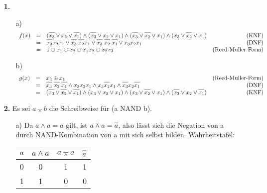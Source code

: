 \documentclass[a4paper,10pt]{scrartcl}
\begin{document}
\begin{enumerate}
    \item[\textbf{1.}]
    \begin{enumerate}
        \item[a)]
            $$\begin{array}{rclr}
                f(x)
                &=& (\oline{x_3} \vee x_2 \vee \oline{x_1}) \wedge (\oline{x_3} \vee x_2 \vee x_1) \wedge
                    (\oline{x_3} \vee \oline{x_2} \vee x_1) \wedge (x_3 \vee  \oline{x_2} \vee x_1) & \text{(KNF)}\\
                &=& \oline{x_3}x_2x_1 \vee \oline{x_3}\;\oline{x_2}x_1 \vee \oline{x_3}\;\oline{x_2}\;\oline{x_1}
                    \vee x_3x_2x_1 & \text{(DNF)}\\
                &=& 1 \oplus x_1 \oplus x_2 \oplus x_1x_2 \oplus x_2x_3 & \text{(Reed-Muller-Form)}\\
            \end{array}$$

        \item[b)]
            $$\begin{array}{rclr}
                g(x) &=& x_3 \oplus x_1 & \text{(Reed-Muller-Form)}\\
                &=& \oline{x_3}\;\oline{x_2}\;\oline{x_1} \wedge x_3x_2x_1 \wedge
                    x_3\oline{x_2}x_1 \wedge \oline{x_3}x_2\oline{x_1} & \text{(DNF)}\\
                &=& (\oline{x_3} \vee \oline{x_2} \vee \oline{x_1})\wedge (x_3 \vee x_2 \vee x_1)\wedge (x_3 \vee  \oline{x_2} \vee x_1)
                    \wedge ( \oline{x_3} \vee x_2 \vee  \oline{x_1})  & \text{(KNF)}
            \end{array}$$

    \end{enumerate}

    \item[\textbf{2.}]
            Es sei $a \barwedge b$ die Schreibweise für (a NAND b).

    \begin{enumerate}
        \item[a)]
            Da $a \wedge a = a$ gilt, ist $a \barwedge a = \oline{a}$, also lässt sich die Negation von a durch NAND-Kombination
            von a mit sich selbst bilden. Wahrheitstafel:

            \hspace{1cm}\begin{tabular}[t]{c|c||c|c}
                $a$ & $a \wedge a$ & $a \barwedge a$ & $\oline{a}$ \\
                \hline
                0 & 0 & 1 & 1 \\
                1 & 1 & 0 & 0
            \end{tabular}


\end{enumerate}
\end{enumerate}
\end{document}
